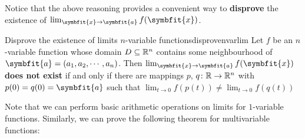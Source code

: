 \documentclass[math]{amznotes}
\theoremstyle{remark}
\begin{document}
Notice that the above reasoning provides a convenient way to {\color{red} \textbf{disprove}} the existence of $\lim_{\symbfit{x} \to \symbfit{a}} f(\symbfit{x})$.
\begin{thmbox}{Disprove the existence of limits $n$-variable functions}{disprovenvarlim}
    Let $f$ be an $n$-variable function whose domain $D \subseteq \mathbb{R}^n$ contains some neighbourhood of $\symbfit{a} = \left(a_1, a_2, \cdots, a_n\right)$. Then $\lim_{\symbfit{x} \to \symbfit{a}} f(\symbfit{x})$ {\color{red} \textbf{does not exist}} if and only if there are mappings $p$, $q \colon \mathbb{R} \to \mathbb{R}^n$ with $p(0) = q(0) = \symbfit{a}$ such that $\lim_{t \to 0}f(p(t)) \neq \lim_{t \to 0}f(q(t))$
\end{thmbox}
Note that we can perform basic arithmetic operations on limits for $1$-variable functions. Similarly, we can prove the following theorem for multivariable functions:
\end{document}
